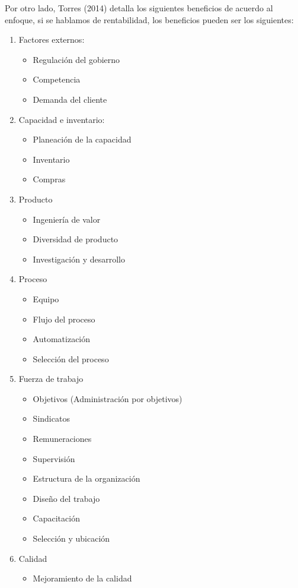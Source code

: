 Por otro lado, Torres (2014) detalla los siguientes beneficios de acuerdo al enfoque, si se hablamos de rentabilidad, los beneficios pueden ser los siguientes:
\begin{enumerate}
	\item Factores externos:
		\begin{itemize}
			\item Regulación del gobierno
			\item Competencia
			\item Demanda del cliente
		\end{itemize}
	\item Capacidad e inventario:
		\begin{itemize}
			\item Planeación de la capacidad
			\item Inventario
			\item Compras
		\end{itemize}
	\item Producto
		\begin{itemize}
			\item Ingeniería de valor
			\item Diversidad de producto
			\item Investigación y desarrollo
		\end{itemize}
	\item Proceso
		\begin{itemize}
			\item Equipo
			\item Flujo del proceso
			\item Automatización
			\item Selección del proceso
		\end{itemize}
	\item Fuerza de trabajo
		\begin{itemize}
			\item Objetivos (Administración por objetivos)
			\item Sindicatos
			\item Remuneraciones
			\item Supervisión
			\item Estructura de la organización
			\item Diseño del trabajo
			\item Capacitación
			\item Selección y ubicación
		\end{itemize}
	\item Calidad
		\begin{itemize}
			\item Mejoramiento de la calidad
		\end{itemize}
\end{enumerate}